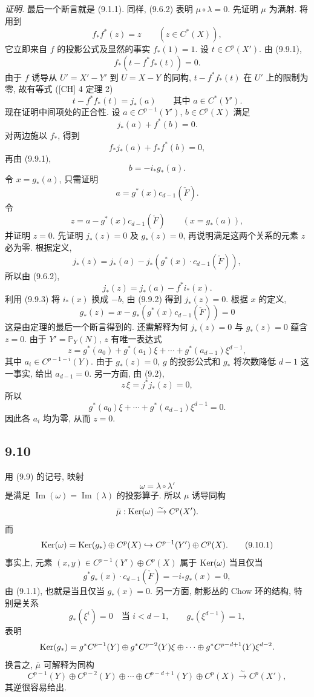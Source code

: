 \emph{证明.} 最后一个断言就是 (9.1.1). 同样, (9.6.2) 表明 $\mu\circ\lambda=0$. 先证明 $\mu$ 为满射. 将用到
\[
f_*f^*(z)=z\qquad(z\in C^*(X)),
\tag{9.9.1}
\]
它立即来自 $f$ 的投影公式及显然的事实 $f_*(1)=1$. 设 $t\in C^p(X')$. 由 (9.9.1),
\[
f_*(t-f^*f_*(t))=0.
\]
由于 $f$ 诱导从 $U'=X'-Y'$ 到 $U=X-Y$ 的同构, $t-f^*f_*(t)$ 在 $U'$ 上的限制为零, 故有等式 ([CH] 4 定理 2)
\[
t-f^*f_*(t)=j_*(a)
\qquad\text{其中 }a\in C^*(Y').
\]
现在证明中间项处的正合性. 设 $a\in C^{p-1}(Y')$, $b\in C^p(X)$ 满足
\[
j_*(a)+f^*(b)=0.
\tag{9.9.2}
\]
对两边施以 $f_*$, 得到
\[
f_*j_*(a)+f_*f^*(b)=0,
\]
再由 (9.9.1),
\[
b=-i_*g_*(a).
\tag{9.9.3}
\]
令 $x=g_*(a)$, 只需证明
\[
a=g^*(x)c_{d-1}(\check F).
\tag{9.9.4}
\]
令
\[
z=a-g^*(x)c_{d-1}(\check F)\qquad(x=g_*(a)),
\]
并证明 $z=0$. 先证明 $j_*(z)=0$ 及 $g_*(z)=0$, 再说明满足这两个关系的元素 $z$ 必为零. 根据定义,
\[
j_*(z)=j_*(a)-j_*(g^*(x)\cdot c_{d-1}(\check F)),
\]
所以由 (9.6.2),
\[
j_*(z)=j_*(a)-f^*i_*(x).
\]
利用 (9.9.3) 将 $i_*(x)$ 换成 $-b$, 由 (9.9.2) 得到 $j_*(z)=0$. 根据 $x$ 的定义,
\[
g_*(z)=x-g_*(g^*(x)c_{d-1}(\check F))=0
\]
这是由定理的最后一个断言得到的. 还需解释为何 $j_*(z)=0$ 与 $g_*(z)=0$ 蕴含 $z=0$. 由于 $Y'=\mathbb P_Y(N)$, $z$ 有唯一表达式
\[
z=g^*(a_0)+g^*(a_1)\xi+\cdots+g^*(a_{d-1})\xi^{d-1},
\]
其中 $a_i\in C^{p-1-i}(Y)$. 由于 $g_*(z)=0$, $g$ 的投影公式和 $g_*$ 将次数降低 $d-1$ 这一事实, 给出 $a_{d-1}=0$. 另一方面, 由 (9.2),
\[
z\,\xi=j^*j_*(z)=0,
\]
所以
\[
g^*(a_0)\xi+\cdots+g^*(a_{d-1})\xi^{d-1}=0.
\]
因此各 $a_i$ 均为零, 从而 $z=0$.

\subsection*{9.10}

用 (9.9) 的记号, 映射
\[
\omega=\lambda\circ\lambda'
\]
是满足 $\operatorname{Im}(\omega)=\operatorname{Im}(\lambda)$ 的投影算子. 所以 $\mu$ 诱导同构
\[
\bar\mu:\operatorname{Ker}(\omega)\xrightarrow{\sim}C^p(X').
\]
而
\[
\operatorname{Ker}(\omega)=\operatorname{Ker}(g_*)\oplus C^p(X)\hookrightarrow C^{p-1}(Y')\oplus C^p(X).
\tag{9.10.1}
\]
事实上, 元素 $(x,y)\in C^{p-1}(Y')\oplus C^p(X)$ 属于 $\operatorname{Ker}(\omega)$ 当且仅当
\[
g^*g_*(x)\cdot c_{d-1}(\check F)=-i_*g_*(x)=0,
\]
由 (9.1.1), 也就是当且仅当 $g_*(x)=0$. 另一方面, 射影丛的 Chow 环的结构, 特别是关系
\[
g_*(\xi^i)=0\quad\text{当 }i<d-1,\qquad g_*(\xi^{d-1})=1,
\]
表明
\[
\operatorname{Ker}(g_*)=g^*C^{p-1}(Y)\oplus g^*C^{p-2}(Y)\xi\oplus\cdots\oplus g^*C^{p-d+1}(Y)\xi^{d-2}.
\]
换言之, $\bar\mu$ 可解释为同构
\[
C^{p-1}(Y)\oplus C^{p-2}(Y)\oplus\cdots\oplus C^{p-d+1}(Y)\oplus C^p(X)
\xrightarrow{\sim}C^p(X'),
\tag{9.10.2}
\]
其逆很容易给出.

